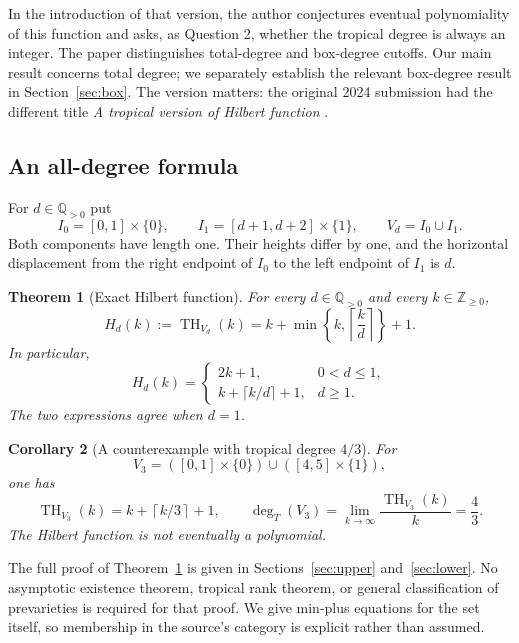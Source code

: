 \documentclass[11pt,a4paper]{article}
\numberwithin{equation}{section}
\newtheorem{theorem}{Theorem}[section]
\newtheorem{corollary}[theorem]{Corollary}
\theoremstyle{definition}
\theoremstyle{remark}
\newcommand{\Q}{\mathbb Q}
\newcommand{\N}{\mathbb Z_{\geq0}}
\newcommand{\tHilb}{\operatorname{TH}}
\newcommand{\degT}{\operatorname{deg}_{T}}
\newcommand{\ceil}[1]{\left\lceil #1\right\rceil}
\begin{document}
In the introduction of that version, the author conjectures eventual
polynomiality of this function and asks, as Question 2, whether the tropical
degree is always an integer. The paper distinguishes total-degree and
box-degree cutoffs. Our main result concerns total degree; we separately
establish the relevant box-degree result in Section~\ref{sec:box}.
The version matters: the original 2024 submission had the different title
\emph{A tropical version of Hilbert function} \cite{Grigoriev2024}.

\subsection{An all-degree formula}

For $d\in\Q_{>0}$ put
\begin{equation}
\label{eq:V}
I_0=[0,1]\times\{0\},\qquad
I_1=[d+1,d+2]\times\{1\},\qquad
V_d=I_0\cup I_1.
\end{equation}
Both components have length one. Their heights differ by one, and the
horizontal displacement from the right endpoint of $I_0$ to the left
endpoint of $I_1$ is $d$.

\begin{theorem}[Exact Hilbert function]
\label{thm:main}
For every $d\in\Q_{>0}$ and every $k\in\N$,
\begin{equation}
\label{eq:main}
H_d(k):=\tHilb_{V_d}(k)
=k+\min\left\{k,\ceil{\frac{k}{d}}\right\}+1.
\end{equation}
In particular,
\begin{equation}
\label{eq:piecewise}
H_d(k)=
\begin{cases}
2k+1,&0<d\leq1,\\[2pt]
k+\lceil k/d\rceil+1,&d\geq1.
\end{cases}
\end{equation}
The two expressions agree when $d=1$.
\end{theorem}

\begin{corollary}[A counterexample with tropical degree $4/3$]
\label{cor:main}
For
\[
V_3=([0,1]\times\{0\})\cup([4,5]\times\{1\}),
\]
one has
\begin{equation}
\label{eq:d3}
\tHilb_{V_3}(k)=k+\ceil{k/3}+1,
\qquad
\degT(V_3)=\lim_{k\to\infty}\frac{\tHilb_{V_3}(k)}{k}=\frac43.
\end{equation}
The Hilbert function is not eventually a polynomial.
\end{corollary}

The full proof of Theorem~\ref{thm:main} is given in
Sections~\ref{sec:upper} and~\ref{sec:lower}. No asymptotic existence theorem,
tropical rank theorem, or general classification of prevarieties is required
for that proof. We give min-plus equations for the set itself, so membership
in the source's category is explicit rather than assumed.
\end{document}
